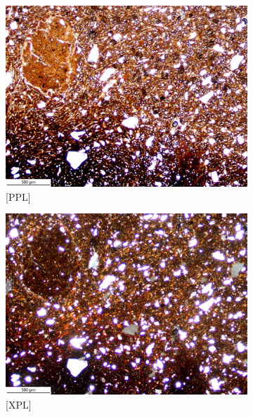 \documentclass[a4paper]{article}
\begin{document}
\begin{figure}[H]
	\centering
	\begin{subfigure}[t]{.49\textwidth}
		\includegraphics[width=\textwidth]{ThinSections/106-1_4x_PPL.jpg}
		\caption{[PPL]}
	\end{subfigure}\hspace{.5em}\hfill
	\begin{subfigure}[t]{.49\textwidth}
		\includegraphics[width=\textwidth]{ThinSections/106-1_4x_XPL.jpg}
		\caption{[XPL]}
	\end{subfigure}
	\begin{subfigure}[t]{.32\textwidth}

\end{subfigure}
\end{figure}
\end{document}
